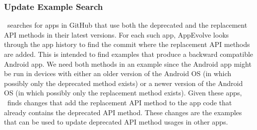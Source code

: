 
\subsubsection{Update Example Search}
\toolname\ searches for apps in GitHub that use both the deprecated and the replacement API methods in their latest versions.  For each such app, AppEvolve looks through the app history to find the commit where the replacement API methods are added. This is intended to find examples that produce a backward compatible Android app. We need both methods in an example since the Android app might be run in devices with either an older version of the Android OS (in which possibly only the deprecated method exists) or a newer version of the Android OS (in which possibly only the replacement method exists). Given these apps, \toolname\ finds changes that add the replacement API method to the app code that already contains the deprecated API method. These changes are the examples that can be used to update deprecated API method usages in other apps.

